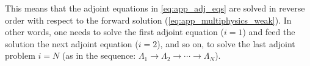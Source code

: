 This means that the adjoint equations in \eqref{eq:app_adj_eqs} are solved in reverse order with respect to the forward solution (\eqref{eq:app_multiphysics_weak}). In other words, one needs to solve the first adjoint equation ($i=1$) 
and feed the solution the next adjoint equation ($i=2$), and so on, to solve the last adjoint problem $i=N$  (as in the sequence: $\Lambda_1 \to \Lambda_{2} \to \cdots \to \Lambda_N$).




